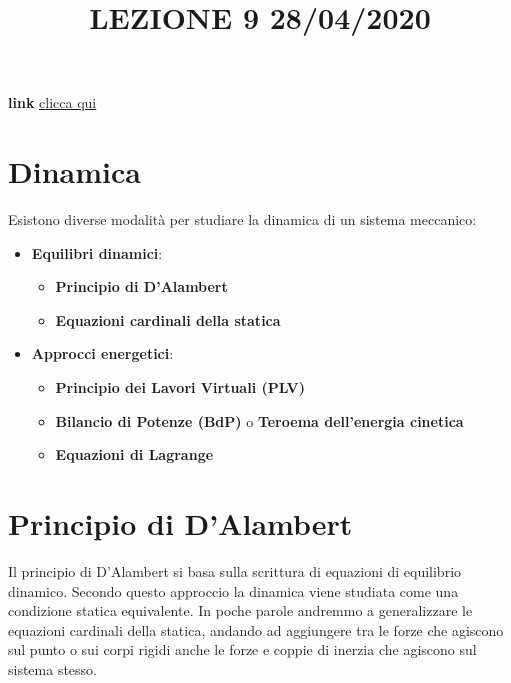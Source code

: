 \title{LEZIONE 9 28/04/2020}\newline
\textbf{link} \href{https://web.microsoftstream.com/video/673607e9-751d-488b-bb1d-79ee783a9b29}{clicca qui}
\section{Dinamica}
Esistono diverse modalità per studiare la dinamica di un sistema meccanico:
\begin{itemize}
    \item \textbf{Equilibri dinamici}:
    \begin{itemize}
        \item \textbf{Principio di D'Alambert}
        \item \textbf{Equazioni cardinali della statica}
    \end{itemize}
    \item \textbf{Approcci energetici}:
    \begin{itemize}
        \item \textbf{Principio dei Lavori Virtuali (PLV)}
        \item \textbf{Bilancio di Potenze (BdP)} o \textbf{Teroema dell'energia cinetica}
        \item \textbf{Equazioni di Lagrange}
    \end{itemize}
\end{itemize}
\newpage
\section{Principio di D'Alambert}
Il principio di D'Alambert si basa sulla scrittura di equazioni di equilibrio dinamico.\newline
\newline
Secondo questo approccio la dinamica viene studiata come una condizione statica equivalente. In poche parole andremmo a generalizzare le equazioni cardinali della statica, andando ad aggiungere tra le forze che agiscono sul punto o sui corpi rigidi anche le forze e coppie di inerzia che agiscono sul sistema stesso.
